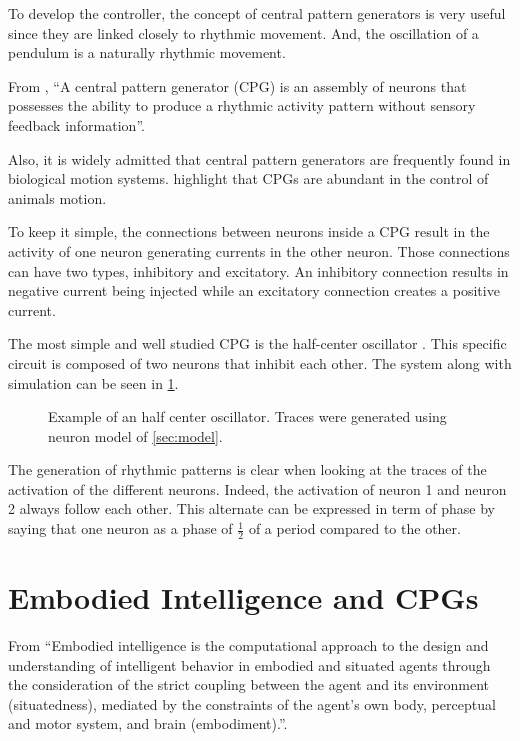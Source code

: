 To develop the controller, the concept of central pattern generators is very useful since they are linked closely to rhythmic movement. And, the oscillation of a pendulum is a naturally rhythmic movement.

From \citet{cpgDef}, \enquote{A central pattern generator (CPG) is an assembly of neurons that possesses the ability to produce a rhythmic activity pattern without  sensory feedback information}. 

Also, it is widely admitted that central pattern generators are frequently found in biological motion systems. \citet{cpgMotion, cpgMotion2} highlight that CPGs are abundant in the control of animals motion.

To keep it simple, the connections between neurons inside a CPG result in the activity of one neuron generating currents in the other neuron. Those connections can have two types, inhibitory and excitatory. An inhibitory connection results in negative current being injected while an excitatory connection creates a positive current.

The most simple and well studied CPG is the half-center oscillator \citep{halfcenter}. This specific circuit is composed of two neurons that inhibit each other. The system along with simulation can be seen in \ref{fig:halfcenter}.

\begin{figure}[htb]
    \centering
    \caption{Example of an half center oscillator. Traces were generated using neuron model of \cref{sec:model}.}
    \label{fig:halfcenter}
\end{figure}

The generation of rhythmic patterns is clear when looking at the traces of the activation of the different neurons. Indeed, the activation of neuron 1 and neuron 2 always follow each other. This alternate can be expressed in term of phase by saying that one neuron as a phase of $\frac{1}{2}$ of a period compared to the other. 

\section{Embodied Intelligence and CPGs} 

From \citet{embodiedDef} \enquote{Embodied intelligence is the computational approach to the design and understanding of intelligent behavior in embodied and situated agents through the consideration of the strict coupling between the agent and its environment (situatedness), mediated by the constraints of the agent’s own body, perceptual and motor system, and brain (embodiment).}.

